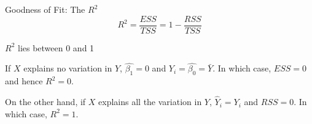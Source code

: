 \documentclass{./../div_teaching_slides}
\begin{document}
\begin{frame}{Goodness of Fit: The $R^2$}
$$ R^2 = \frac{ESS}{TSS} = 1-\frac{RSS}{TSS} $$

\vspace{1em}
$R^2$ lies between 0 and 1 \\
\begin{witemize}
  \item If $X$ explains no variation in $Y$, $\hat{\beta_1}=0$ and $ \hat{Y_i} = \hat{\beta_0} = \bar{Y}$. In which case, $ESS=0$ and hence $R^2=0$.
  \item On the other hand, if $X$ explains all the variation in $Y$, $\hat{Y}_i=Y_i$ and $RSS=0$. In which case, $R^2=1$.
\end{witemize}
\end{frame}
\end{document}
